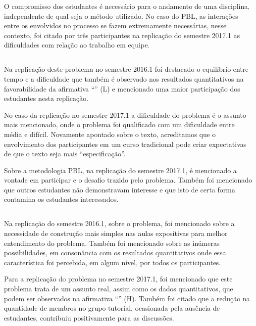 O compromisso dos estudantes é necessário para
o andamento de uma disciplina, independente de qual seja
o método utilizado.
No caso do \ac{PBL}, as interações entre os envolvidos no processo
se fazem extremamente necessárias, nesse contexto,
foi citado por três participantes na replicação do semestre 2017.1 as dificuldades
com relação ao trabalho em equipe.

\subsection{\ProblemaC}

Na replicação deste problema no semestre 2016.1
foi destacado o equilíbrio entre tempo e a dificuldade
que também é observado nos resultados quantitativos
na favorabilidade da afirmativa ``\LikertPL'' (L)
e mencionado uma maior participação
dos estudantes nesta replicação.

No caso da replicação no semestre 2017.1 a dificuldade
do problema é o assunto mais mencionado, onde o problema foi
qualificado com um dificuldade entre média e difícil.
Novamente apontado sobre o texto, acreditamos que o
envolvimento dos participantes em um curso
tradicional pode criar expectativas de que o texto
seja mais ``especificação''.

Sobre a metodologia \ac{PBL}, na replicação do semestre 2017.1,
é mencionado a vontade em participar e o desafio trazido
pelo problema.
Também foi mencionado que outros estudantes não
demonstravam interesse e que isto de certa forma
contamina os estudantes interessados.

\subsection{\ProblemaD}

Na replicação do semestre 2016.1, sobre o problema, foi mencionado
sobre a necessidade de construção mais simples nas aulas
expositivas para melhor entendimento do problema.
Também foi mencionado sobre as inúmeras possibilidades, em consonância
com os resultados quantitativos onde essa característica foi
percebida, em algum nível, por todos os participantes.

Para a replicação do problema no semestre 2017.1, foi mencionado
que este problema trata de um assunto real, assim como
os dados quantitativos, que podem ser observados
na afirmativa ``\LikertPH'' (H).
Também foi citado que a redução na quantidade de membros no grupo
tutorial, ocasionada pela ausência de estudantes, contribuiu
positivamente para as discussões.

